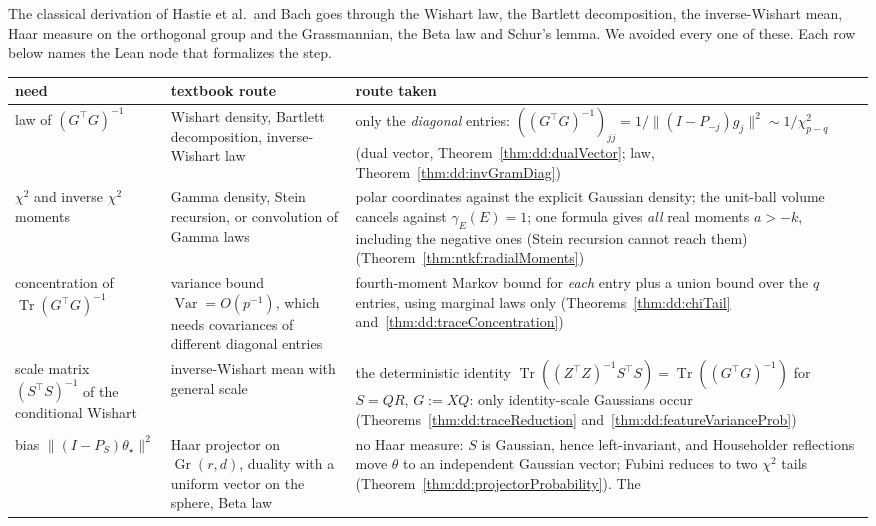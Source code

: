 \begin{remark}\label{rmk:dd:route}
The classical derivation of Hastie et al.\ and Bach goes through the Wishart law, the Bartlett decomposition, the inverse-Wishart mean, Haar
measure on the orthogonal group and the Grassmannian, the Beta law and Schur's lemma. We avoided every one of these. Each row below names the Lean node that formalizes the step.
\begin{center}
\small
\begin{tabular}{p{}p{}p{}}
need & textbook route & route taken\\ \hline
law of $(G^\top G)^{-1}$ &
Wishart density, Bartlett decomposition, inverse-Wishart law &
only the \emph{diagonal} entries: $((G^\top G)^{-1})_{jj}=1/\|(I-P_{-j})g_j\|^2\sim1/\chi^2_{p-q}$ (dual vector, Theorem~\ref{thm:dd:dualVector}; law, Theorem~\ref{thm:dd:invGramDiag})\\[1ex]
$\chi^2$ and inverse $\chi^2$ moments &
Gamma density, Stein recursion, or convolution of Gamma laws &
polar coordinates against the explicit Gaussian density; the unit-ball volume cancels against $\gamma_E(E)=1$; one formula gives \emph{all} real
moments $a>-k$, including the negative ones (Stein recursion cannot reach them) (Theorem~\ref{thm:ntkf:radialMoments})\\[1ex]
concentration of $\operatorname{Tr}(G^\top G)^{-1}$ &
variance bound $\operatorname{Var}=O(p^{-1})$, which needs covariances of different diagonal entries &
fourth-moment Markov bound for \emph{each} entry plus a union bound over the $q$ entries, using marginal laws only (Theorems~\ref{thm:dd:chiTail} and~\ref{thm:dd:traceConcentration})\\[1ex]
scale matrix $(S^\top S)^{-1}$ of the conditional Wishart &
inverse-Wishart mean with general scale &
the deterministic identity $\operatorname{Tr}((Z^\top Z)^{-1}S^\top S)=\operatorname{Tr}((G^\top G)^{-1})$ for $S=QR$, $G:=XQ$: only identity-scale Gaussians
occur (Theorems~\ref{thm:dd:traceReduction} and~\ref{thm:dd:featureVarianceProb})\\[1ex]
bias $\|(I-P_S)\theta_\star\|^2$ &
Haar projector on $\operatorname{Gr}(r,d)$, duality with a uniform vector on the sphere, Beta law &
no Haar measure: $S$ is Gaussian, hence left-invariant, and Householder reflections move $\theta$ to an independent Gaussian vector; Fubini reduces to two $\chi^2$ tails (Theorem~\ref{thm:dd:projectorProbability}). The

\end{tabular}
\end{center}
\end{remark}
